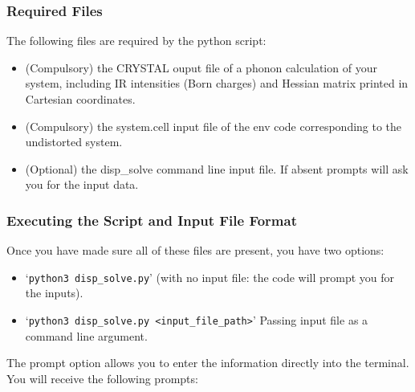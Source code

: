 \subsubsection{Required Files}
The following files are required by the python script:
\begin{itemize}  
  \item (Compulsory) the CRYSTAL ouput file of a phonon calculation of your system, including IR intensities (Born charges) and Hessian matrix printed in Cartesian coordinates.
  \item (Compulsory) the system.cell input file of the env code corresponding to the undistorted system.
  \item (Optional) the disp\_solve command line input file. If absent prompts will ask you for the input data.  
\end{itemize}

\subsubsection{Executing the Script and Input File Format}
Once you have made sure all of these files are present, you have two options: 
\begin{itemize}
	\item `\texttt{python3 disp\_solve.py}' (with no input file: the code will prompt you for the inputs).
	\item `\texttt{python3 disp\_solve.py <input\_file\_path>}' Passing input file as a command line argument.
\end{itemize}

The prompt option allows you to enter the information directly into the terminal. You will receive the following prompts:

